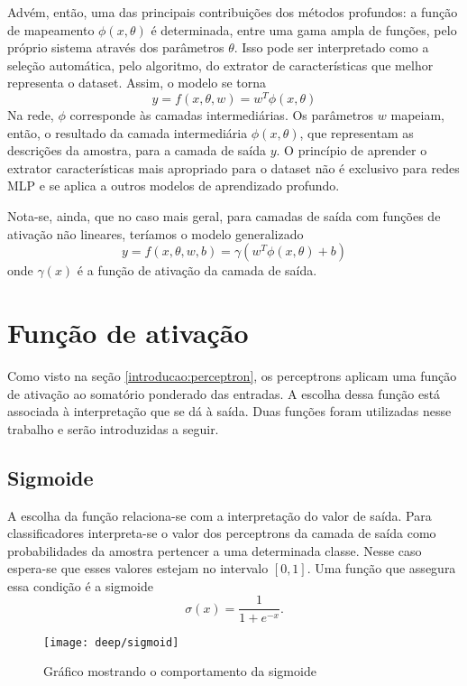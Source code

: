 Advém, então, uma das principais contribuições dos métodos profundos: a função de mapeamento $\phi(x,\theta)$ é determinada, entre uma gama ampla de funções, pelo próprio sistema através dos parâmetros $\theta$. Isso pode ser interpretado como a seleção automática, pelo algoritmo, do extrator de características que melhor representa o dataset. Assim, o modelo se torna 
\begin{equation}
y=f(x,\theta,w) = w^T\phi(x,\theta)
\end{equation}
Na rede, $\phi$ corresponde às camadas intermediárias. Os parâmetros $w$ mapeiam, então, o resultado da camada intermediária $\phi(x,\theta)$, que representam as descrições da amostra, para a camada de saída $y$. O princípio de aprender o extrator características mais apropriado para o dataset não é exclusivo para redes MLP e se aplica a outros modelos de aprendizado profundo.

Nota-se, ainda, que no caso mais geral, para camadas de saída com funções de ativação não lineares, teríamos o modelo generalizado
\begin{equation}
y=f(x,\theta,w,b) = \gamma(w^T\phi(x,\theta)+b)
\end{equation}
onde $\gamma(x)$ é a função de ativação da camada de saída.

\section{Função de ativação}
Como visto na seção \ref{introducao:perceptron}, os perceptrons aplicam uma função de ativação ao somatório ponderado das entradas. A escolha dessa função está associada à interpretação que se dá à saída. Duas funções foram utilizadas nesse trabalho e serão introduzidas a seguir.

\subsection{Sigmoide}
A escolha da função relaciona-se com a interpretação do valor de saída. Para classificadores interpreta-se o valor dos perceptrons da camada de saída como probabilidades da amostra pertencer a uma determinada classe. Nesse caso espera-se que esses valores estejam no intervalo $[0,1]$. Uma função que assegura essa condição é a sigmoide
\begin{equation}
	\label{eq:sigm}
	\sigma(x) = \frac{1}{1+e^{-x}}.
\end{equation}

\begin{figure}[h]
\centering
\texttt{[image: deep/sigmoid]}
\caption{Gráfico mostrando o comportamento da sigmoide}
\label{fig:sigmoid}
\end{figure}

